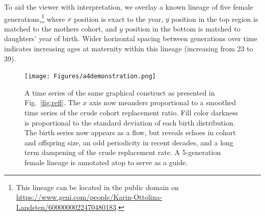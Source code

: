 \documentclass{article}
\begin{document}
To aid the viewer with interpretation, we overlay a known lineage of five female generations,\footnote{This lineage can be located in the public domain on \url{https://www.geni.com/people/Karin-Ottolina-Landsten/6000000022470480183}.} where $x$ position is exact to the year, $y$ position in the top region is matched to the mothers cohort, and $y$ position in the bottom is matched to daughters' year of birth. Wider horizontal spacing between generations over time indicates increasing ages at maternity within this lineage (increasing from 23 to 39).



\begin{figure}
\texttt{[image: Figures/a4demonstration.png]}
%
\caption{A time series of the same graphical construct as presented in Fig.~\ref{fig:refl}. The $x$ axis now meanders proportional to a smoothed time series of the crude cohort replacement ratio. Fill color darkness is proportional to the standard deviation of each birth distribution. The birth series now appears as a flow, but reveals echoes in cohort and offspring size, an odd periodicity in recent decades, and a long term dampening of the crude replacement rate. A 5-generation female lineage is annotated atop to serve as a guide.}
\label{fig:foldout}
\end{figure}


\end{document}
